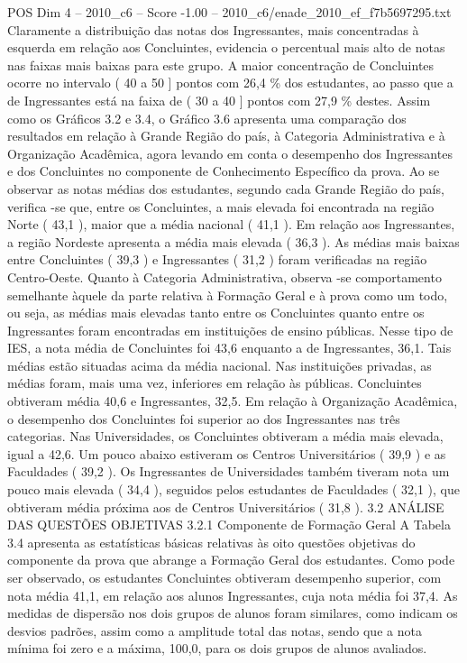 \begin{textsample}{POS Dim 4 – 2010\_c6 – Score -1.00 – 2010\_c6/enade\_2010\_ef\_f7b5697295.txt}
Claramente a distribuição das notas dos Ingressantes, mais concentradas à esquerda em relação aos Concluintes, evidencia o percentual mais alto de notas nas faixas mais baixas para este grupo.
A maior concentração de Concluintes ocorre no intervalo ( 40 a 50 ] pontos com 26,4 \% dos estudantes, ao passo que a de Ingressantes está na faixa de ( 30 a 40 ] pontos com 27,9 \% destes.
Assim como os Gráficos 3.2 e 3.4, o Gráfico 3.6 apresenta uma comparação dos resultados em relação à Grande Região do país, à Categoria Administrativa e à Organização Acadêmica, agora levando em conta o desempenho dos Ingressantes e dos Concluintes no componente de Conhecimento Específico da prova.
Ao se observar as notas médias dos estudantes, segundo cada Grande Região do país, verifica -se que, entre os Concluintes, a mais elevada foi encontrada na região Norte ( 43,1 ), maior que a média nacional ( 41,1 ).
Em relação aos Ingressantes, a região Nordeste apresenta a média mais elevada ( 36,3 ).
As médias mais baixas entre Concluintes ( 39,3 ) e Ingressantes ( 31,2 ) foram verificadas na região Centro-Oeste.
Quanto à Categoria Administrativa, observa -se comportamento semelhante àquele da parte relativa à Formação Geral e à prova como um todo, ou seja, as médias mais elevadas tanto entre os Concluintes quanto entre os Ingressantes foram encontradas em instituições de ensino públicas.
Nesse tipo de IES, a nota média de Concluintes foi 43,6 enquanto a de Ingressantes, 36,1.
Tais médias estão situadas acima da média nacional.
Nas instituições privadas, as médias foram, mais uma vez, inferiores em relação às públicas.
Concluintes obtiveram média 40,6 e Ingressantes, 32,5.
Em relação à Organização Acadêmica, o desempenho dos Concluintes foi superior ao dos Ingressantes nas três categorias.
Nas Universidades, os Concluintes obtiveram a média mais elevada, igual a 42,6.
Um pouco abaixo estiveram os Centros Universitários ( 39,9 ) e as Faculdades ( 39,2 ).
Os Ingressantes de Universidades também tiveram nota um pouco mais elevada ( 34,4 ), seguidos pelos estudantes de Faculdades ( 32,1 ), que obtiveram média próxima aos de Centros Universitários ( 31,8 ). 3.2 ANÁLISE DAS QUESTÕES OBJETIVAS 3.2.1 Componente de Formação Geral A Tabela 3.4 apresenta as estatísticas básicas relativas às oito questões objetivas do componente da prova que abrange a Formação Geral dos estudantes.
Como pode ser observado, os estudantes Concluintes obtiveram desempenho superior, com nota média 41,1, em relação aos alunos Ingressantes, cuja nota média foi 37,4.
As medidas de dispersão nos dois grupos de alunos foram similares, como indicam os desvios padrões, assim como a amplitude total das notas, sendo que a nota mínima foi zero e a máxima, 100,0, para os dois grupos de alunos avaliados.

\end{textsample}
